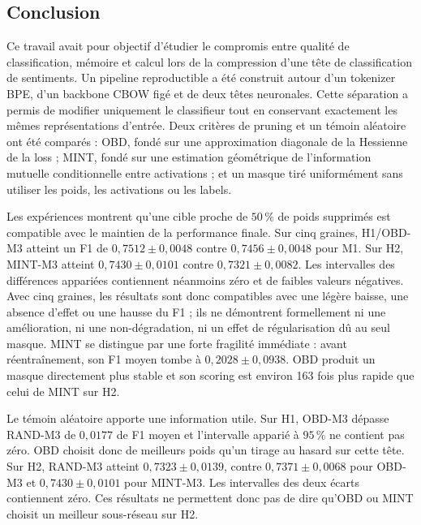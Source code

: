 
\subsection{Conclusion}
\label{ssec:conclusion_conclusion}

Ce travail avait pour objectif d'étudier le compromis entre qualité de
classification, mémoire et calcul lors de la compression d'une tête de
classification de sentiments. Un pipeline reproductible a été construit autour
d'un tokenizer BPE, d'un backbone CBOW figé et de deux têtes neuronales. Cette
séparation a permis de modifier uniquement le classifieur tout en conservant
exactement les mêmes représentations d'entrée. Deux critères de pruning et un
témoin aléatoire ont été comparés : OBD, fondé sur une approximation diagonale
de la Hessienne de la loss ; MINT, fondé sur une estimation géométrique de
l'information mutuelle conditionnelle entre activations ; et un masque tiré
uniformément sans utiliser les poids, les activations ou les labels.

Les expériences montrent qu'une cible proche de $50\,\%$ de poids supprimés est
compatible avec le maintien de la performance finale. Sur cinq graines,
H1/OBD-M3 atteint un F1 de $0{,}7512\pm0{,}0048$ contre
$0{,}7456\pm0{,}0048$ pour M1. Sur H2, MINT-M3 atteint
$0{,}7430\pm0{,}0101$ contre $0{,}7321\pm0{,}0082$. Les intervalles des
différences appariées contiennent néanmoins zéro et de faibles valeurs
négatives. Avec cinq graines,
les résultats sont donc compatibles avec une légère baisse, une absence d'effet
ou une hausse du F1 ; ils ne démontrent formellement ni une amélioration, ni une
non-dégradation, ni un effet de régularisation dû au seul masque. MINT se
distingue par une forte fragilité immédiate : avant
réentraînement, son F1 moyen tombe à $0{,}2028\pm0{,}0938$. OBD produit un
masque directement plus stable et son scoring est environ 163 fois plus rapide
que celui de MINT sur H2.

Le témoin aléatoire apporte une information utile. Sur H1, OBD-M3 dépasse
RAND-M3 de $0{,}0177$ de F1 moyen et l'intervalle apparié à $95\,\%$ ne contient
pas zéro. OBD choisit donc de meilleurs poids qu'un tirage au hasard sur cette
tête. Sur H2, RAND-M3 atteint $0{,}7323\pm0{,}0139$, contre
$0{,}7371\pm0{,}0068$ pour OBD-M3 et $0{,}7430\pm0{,}0101$ pour MINT-M3. Les
intervalles des deux écarts contiennent zéro. Ces résultats ne permettent donc
pas de dire qu'OBD ou MINT choisit un meilleur sous-réseau sur H2.

